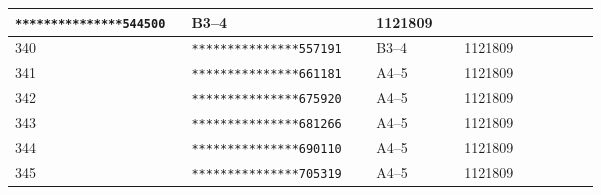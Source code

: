\documentclass[UTF8,10pt,a4paper,fontset=fandol]{ctexart}
\newcommand{\fieldvalue}[1]{#1}
\begin{document}
\begin{center}
\begin{tabular}{|p{0.13\linewidth}|p{0.22\linewidth}|p{0.13\linewidth}|p{0.20\linewidth}|}
\fieldvalue{\texttt{***************544500}}
&
\fieldvalue{B3--4}
&
\fieldvalue{1121809}
&\\
\hline
\fieldvalue{340}
&
\fieldvalue{\texttt{***************557191}}
&
\fieldvalue{B3--4}
&
\fieldvalue{1121809}
&\\
\hline
\fieldvalue{341}
&
\fieldvalue{\texttt{***************661181}}
&
\fieldvalue{A4--5}
&
\fieldvalue{1121809}
&\\
\hline
\fieldvalue{342}
&
\fieldvalue{\texttt{***************675920}}
&
\fieldvalue{A4--5}
&
\fieldvalue{1121809}
&\\
\hline
\fieldvalue{343}
&
\fieldvalue{\texttt{***************681266}}
&
\fieldvalue{A4--5}
&
\fieldvalue{1121809}
&\\
\hline
\fieldvalue{344}
&
\fieldvalue{\texttt{***************690110}}
&
\fieldvalue{A4--5}
&
\fieldvalue{1121809}
&\\
\hline
\fieldvalue{345}
&
\fieldvalue{\texttt{***************705319}}
&
\fieldvalue{A4--5}
&
\fieldvalue{1121809}
&\\

\end{tabular}
\end{center}
\end{document}
